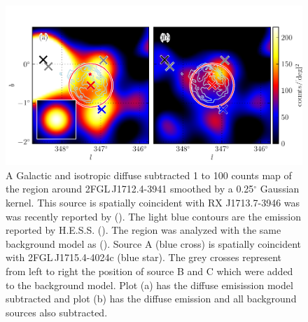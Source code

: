 \documentclass[12pt,preprint]{aastex}
\newcommand{\gev}{\text{GeV}\xspace}
\newcommand{\tev}{\text{TeV}\xspace}
\renewcommand{\deg}{\ensuremath{^\circ}\xspace}
\begin{document}
\begin{figure}
  \begin{center}
    \includegraphics[type=pdf,ext=.pdf,read=.pdf]{source_plots/source_RX_J1713.7-3946}
  \end{center}
  \caption{A Galactic and isotropic diffuse subtracted 1 \gev to 100
  \gev counts map of the region around 2FGL\,J1712.4-3941 smoothed by a
  0.25\deg Gaussian kernel.  This source is spatially coincident with
  RX J1713.7-3946 was was recently reported by (\cite{rx_j1713_lat}).
  The light blue contours are the \tev emission reported by
  H.E.S.S. (\cite{rx_j1713_hess}).  The region was analyzed with the
  same background model as (\cite{rx_j1713_lat}).  Source A (blue cross)
  is spatially coincident with 2FGL\,J1715.4-4024c (blue star).  The grey 
  crosses
  represent from left to right the position of source B and C which were
  added to the background model. Plot (a) has the diffuse emisission model
  subtracted and plot (b) has the diffuse emission and all background
  sources also subtracted.
  }\label{2FGL_J1712.4-3941}
\end{figure}
\end{document}
